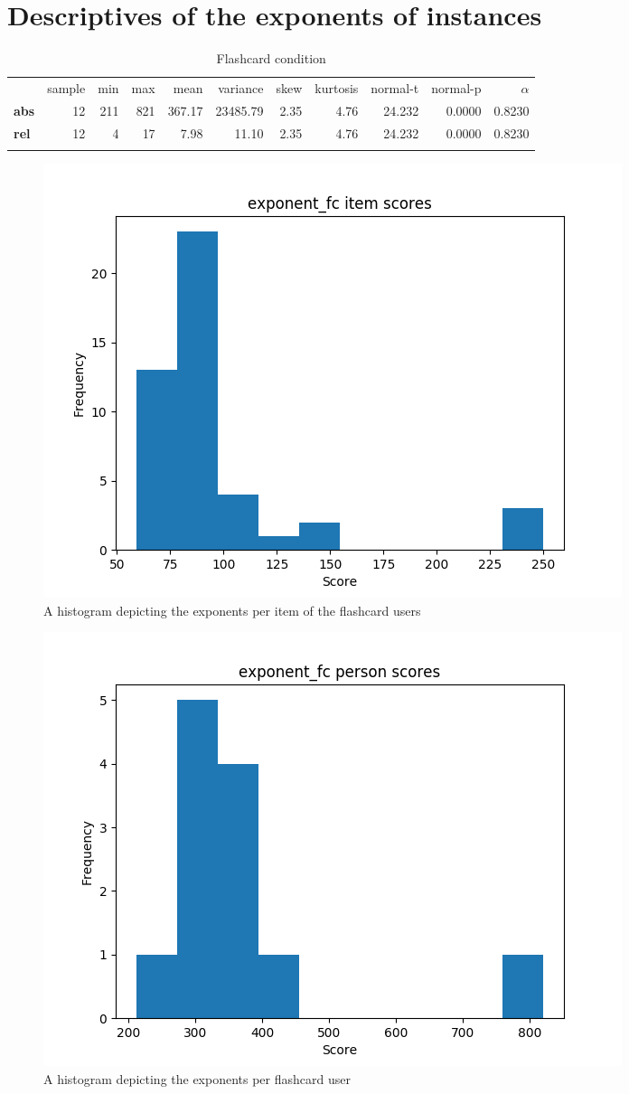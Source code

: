 \section{Descriptives of the exponents of instances}

\begin{longtable}[c]{@{}lrrrrrrrrrr@{}}
    \caption{Flashcard condition}
    \endfirsthead
\toprule\addlinespace
& sample & min & max & mean & variance & skew & kurtosis & normal-t &
normal-p & $\alpha$
\\\addlinespace
\midrule
\textbf{abs} & 12 & 211 & 821 & 367.17 & 23485.79 & 2.35 & 4.76 & 24.232
& 0.0000 & 0.8230
\\\addlinespace
\textbf{rel} & 12 & 4 & 17 & 7.98 & 11.10 & 2.35 & 4.76 & 24.232 &
0.0000 & 0.8230
\\\addlinespace
\bottomrule
    \label{tab:exponent_fc}
\end{longtable}

\begin{figure}
    \centering
    \includegraphics[width=.7\textwidth]{img/exponent_fc_diff.png}
    \caption{A histogram depicting the exponents per item of the flashcard users}
    \label{fig:exponent_fc_diff}
\end{figure}
\begin{figure}
    \centering
    \includegraphics[width=.7\textwidth]{img/exponent_fc_abil.png}
    \caption{A histogram depicting the exponents per flashcard user}
    \label{fig:exponent_fc_abil}
\end{figure}

